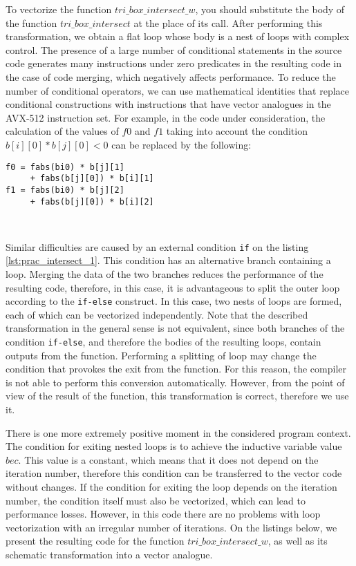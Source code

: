 \documentclass[
11pt,%
tightenlines,%
twoside,%
onecolumn,%
nofloats,%
nobibnotes,%
nofootinbib,%
superscriptaddress,%
noshowpacs,%
centertags]%
{revtex4}
\begin{document}
To vectorize the function $tri\_box\_intersect\_w$, you should substitute the body of the function $tri\_box\_intersect$ at the place of its call.
After performing this transformation, we obtain a flat loop whose body is a nest of loops with complex control.
The presence of a large number of conditional statements in the source code generates many instructions under zero predicates in the resulting code in the case of code merging, which negatively affects performance.
To reduce the number of conditional operators, we can use mathematical identities that replace conditional constructions with instructions that have vector analogues in the AVX-512 instruction set.
For example, in the code under consideration, the calculation of the values of $f0$ and $f1$ taking into account the condition $b[i][0] * b[j][0] < 0$ can be replaced by the following:
\begin{lstlisting}[caption={Using identities to use vector instructions.},label={lst:prac_intersect_16_2}]
f0 = fabs(bi0) * b[j][1]
     + fabs(b[j][0]) * b[i][1]
f1 = fabs(bi0) * b[j][2]
     + fabs(b[j][0]) * b[i][2]
\end{lstlisting}

\

Similar difficulties are caused by an external condition \texttt{if} on the listing \ref{lst:prac_intersect_1}.
This condition has an alternative branch containing a loop.
Merging the data of the two branches reduces the performance of the resulting code, therefore, in this case, it is advantageous to split the outer loop according to the \texttt{if-else} construct.
In this case, two nests of loops are formed, each of which can be vectorized independently.
Note that the described transformation in the general sense is not equivalent, since both branches of the condition \texttt{if-else}, and therefore the bodies of the resulting loops, contain outputs from the function.
Performing a splitting of loop may change the condition that provokes the exit from the function.
For this reason, the compiler is not able to perform this conversion automatically.
However, from the point of view of the result of the function, this transformation is correct, therefore we use it.

There is one more extremely positive moment in the considered program context.
The condition for exiting nested loops is to achieve the inductive variable value $bec$.
This value is a constant, which means that it does not depend on the iteration number, therefore this condition can be transferred to the vector code without changes.
If the condition for exiting the loop depends on the iteration number, the condition itself must also be vectorized, which can lead to performance losses.
However, in this code there are no problems with loop vectorization with an irregular number of iterations.
On the listings below, we present the resulting code for the function $tri\_box\_intersect\_w$, as well as its schematic transformation into a vector analogue.
\end{document}
